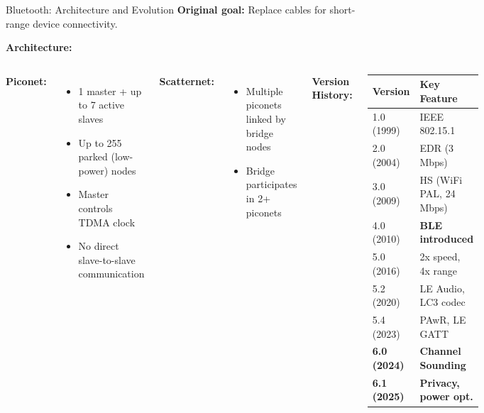 \documentclass[aspectratio=169,11pt]{beamer}
\begin{document}
\begin{frame}{Bluetooth: Architecture and Evolution}
    \textbf{Original goal:} Replace cables for short-range device connectivity.
    
    \vspace{0.2cm}
    \textbf{Architecture:}
    \begin{columns}
        \textbf{Piconet:}
        \begin{itemize}
            \item 1 master + up to 7 active slaves
            \item Up to 255 parked (low-power) nodes
            \item Master controls TDMA clock
            \item No direct slave-to-slave communication
        \end{itemize}
        
        \textbf{Scatternet:}
        \begin{itemize}
            \item Multiple piconets linked by bridge nodes
            \item Bridge participates in 2+ piconets
        \end{itemize}
        
        \textbf{Version History:}
        \begin{center}
        \footnotesize
        \begin{tabular}{ll}
            \toprule
            \textbf{Version} & \textbf{Key Feature} \\
            \midrule
            1.0 (1999) & IEEE 802.15.1 \\
            2.0 (2004) & EDR (3 Mbps) \\
            3.0 (2009) & HS (WiFi PAL, 24 Mbps) \\
            4.0 (2010) & \textbf{BLE introduced} \\
            5.0 (2016) & 2x speed, 4x range \\
            5.2 (2020) & LE Audio, LC3 codec \\
            5.4 (2023) & PAwR, LE GATT \\
            \textbf{6.0 (2024)} & \textbf{Channel Sounding} \\
            \textbf{6.1 (2025)} & \textbf{Privacy, power opt.} \\
            \bottomrule
        \end{tabular}
        \normalsize
        \end{center}
    \end{columns}
\end{frame}
\end{document}
